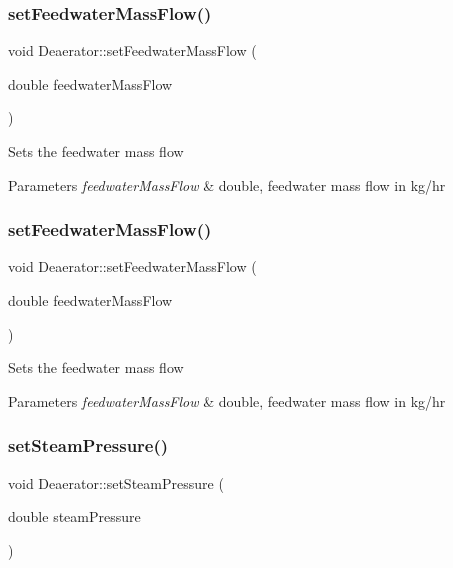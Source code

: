 \subsubsection{\texorpdfstring{set\+Feedwater\+Mass\+Flow()}{setFeedwaterMassFlow()}\hspace{0.1cm}{\footnotesize\ttfamily [2/3]}}
{\footnotesize\ttfamily void Deaerator\+::set\+Feedwater\+Mass\+Flow (\begin{DoxyParamCaption}\item[{double}]{feedwater\+Mass\+Flow }\end{DoxyParamCaption})}

Sets the feedwater mass flow 
\begin{DoxyParams}{Parameters}
{\em feedwater\+Mass\+Flow} & double, feedwater mass flow in kg/hr \\
\hline
\end{DoxyParams}
\mbox{\label{class_deaerator_ada95cb2557bc43602d7bcefbad66c853}} 
\subsubsection{\texorpdfstring{set\+Feedwater\+Mass\+Flow()}{setFeedwaterMassFlow()}\hspace{0.1cm}{\footnotesize\ttfamily [3/3]}}
{\footnotesize\ttfamily void Deaerator\+::set\+Feedwater\+Mass\+Flow (\begin{DoxyParamCaption}\item[{double}]{feedwater\+Mass\+Flow }\end{DoxyParamCaption})}

Sets the feedwater mass flow 
\begin{DoxyParams}{Parameters}
{\em feedwater\+Mass\+Flow} & double, feedwater mass flow in kg/hr \\
\hline
\end{DoxyParams}
\mbox{\label{class_deaerator_a5936221e68b5ba3245f0adabed74e6d7}} 
\subsubsection{\texorpdfstring{set\+Steam\+Pressure()}{setSteamPressure()}\hspace{0.1cm}{\footnotesize\ttfamily [1/3]}}
{\footnotesize\ttfamily void Deaerator\+::set\+Steam\+Pressure (\begin{DoxyParamCaption}\item[{double}]{steam\+Pressure }\end{DoxyParamCaption})}

